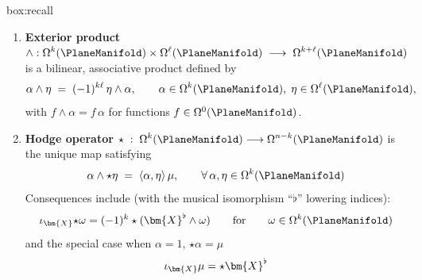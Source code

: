 \begin{ambox}{box:recall}
\begin{enumerate}
\item \textbf{Exterior product}
$\displaystyle 
\wedge : \Omega^{k} (\PlaneManifold)\times\Omega^{\ell} (\PlaneManifold)\;\longrightarrow\;\Omega^{k+\ell} (\PlaneManifold)
$
is a bilinear, associative product defined by %
\[
\alpha\wedge \eta \;=\; (-1)^{k\ell}\, \eta\wedge\alpha,
\qquad
\alpha\in\Omega^{k} (\PlaneManifold),\; \eta\in\Omega^{\ell} (\PlaneManifold),
\]
with \(f\wedge\alpha = f\,\alpha\) for functions \(f\in\Omega^{0} (\PlaneManifold)\).
\item \textbf{Hodge operator} 
$\displaystyle 
\star \;:\;\Omega^{k} (\PlaneManifold)\longrightarrow\Omega^{n-k} (\PlaneManifold)
$
is the unique map satisfying  
\begin{equation}
\alpha\wedge\star \eta \;=\;
\langle\alpha, \eta\rangle\,\mu,
\qquad\forall\,\alpha, \eta\in\Omega^{k} (\PlaneManifold)
\label{eq:hodge-defn}
\end{equation}
Consequences include (with the musical isomorphism  ``\(\flat\)'' lowering indices):
\[
\interior{\bm{X}}{\star \omega} = (-1)^k \star (\bm{X}^{\flat} \wedge \omega)
\qquad\text{for}\qquad \omega \in \Omega^k(\PlaneManifold)
\]
and the special case when \(\alpha=1\), \(\star \alpha = \mu\)
\begin{equation}
\interior{\bm{X}}{\mu} = \star \bm{X}^{\flat}
\label{eq:hodge-zero}
\end{equation}



\end{enumerate}
\end{ambox}
